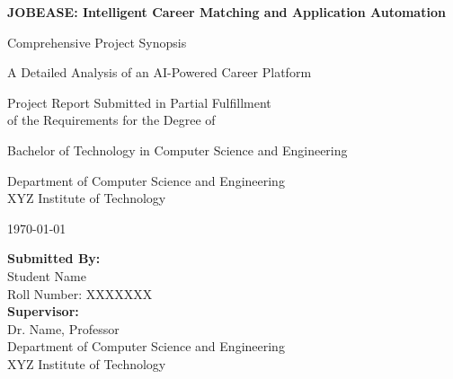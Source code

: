 \documentclass[12pt,a4paper]{report}
\begin{document}
\begin{titlepage}
  \centering
  \vspace*{2cm}
  {\LARGE\bfseries JOBEASE: Intelligent Career Matching and Application Automation\par}
  \vspace{1cm}
  {\Large Comprehensive Project Synopsis\par}
  \vspace{1.5cm}
  {\large A Detailed Analysis of an AI-Powered Career Platform\par}
  \vspace{2cm}
  {\large Project Report Submitted in Partial Fulfillment\\
  of the Requirements for the Degree of\par}
  \vspace{1cm}
  {\large Bachelor of Technology in Computer Science and Engineering\par}
  \vspace{2cm}
  {\large Department of Computer Science and Engineering\\
  XYZ Institute of Technology\par}
  \vspace{2cm}
  {\large \today\par}
  \vfill
  {\large 
  \textbf{Submitted By:}\\
  Student Name\\
  Roll Number: XXXXXXX\\
  \vspace{1cm}
  \textbf{Supervisor:}\\
  Dr. Name, Professor\\
  Department of Computer Science and Engineering\\
  XYZ Institute of Technology
  }
\end{titlepage}
\end{document}
